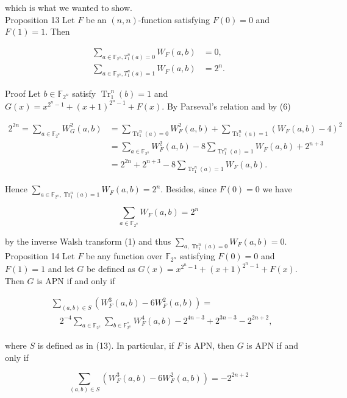 \documentclass[10pt]{article}
\begin{document}
which is what we wanted to show.\\
Proposition 13 Let $F$ be an $(n, n)$-function satisfying $F(0)=0$ and $F(1)=1$. Then


\begin{align*}
\sum_{a \in \mathbb{F}_{2^{n}}, T_{1}^{n}(a)=0} W_{F}(a, b) & =0,  \tag{20}\\
\sum_{a \in \mathbb{F}_{2^{n}}, T_{1}^{n}(a)=1} W_{F}(a, b) & =2^{n} . \tag{21}
\end{align*}


Proof Let $b \in \mathbb{F}_{2^{n}}$ satisfy $\operatorname{Tr}_{1}^{n}(b)=1$ and $G(x)=x^{2^{n}-1}+(x+1)^{2^{n}-1}+F(x)$. By Parseval's relation and by (6)

$$
\begin{aligned}
2^{2 n}=\sum_{a \in \mathbb{F}_{2^{n}}} W_{G}^{2}(a, b) & =\sum_{\operatorname{Tr}_{1}^{n}(a)=0} W_{F}^{2}(a, b)+\sum_{\operatorname{Tr}_{1}^{n}(a)=1}\left(W_{F}(a, b)-4\right)^{2} \\
& =\sum_{a \in \mathbb{F}_{2^{n}}} W_{F}^{2}(a, b)-8 \sum_{\operatorname{Tr}_{1}^{n}(a)=1} W_{F}(a, b)+2^{n+3} \\
& =2^{2 n}+2^{n+3}-8 \sum_{\operatorname{Tr}_{1}^{n}(a)=1} W_{F}(a, b) .
\end{aligned}
$$

Hence $\sum_{a \in \mathbb{F}_{2^{n}}, \operatorname{Tr}_{1}^{n}(a)=1} W_{F}(a, b)=2^{n}$. Besides, since $F(0)=0$ we have

$$
\sum_{a \in \mathbb{F}_{2^{n}}} W_{F}(a, b)=2^{n}
$$

by the inverse Walsh transform (1) and thus $\sum_{a, \operatorname{Tr}_{1}^{n}(a)=0} W_{F}(a, b)=0$.\\
Proposition 14 Let $F$ be any function over $\mathbb{F}_{2^{n}}$ satisfying $F(0)=0$ and $F(1)=1$ and let $G$ be defined as $G(x)=x^{2^{n}-1}+(x+1)^{2^{n}-1}+F(x)$. Then $G$ is APN if and only if


\begin{align*}
& \sum_{(a, b) \in S}\left(W_{F}^{3}(a, b)-6 W_{F}^{2}(a, b)\right)= \\
& \quad 2^{-4} \sum_{a \in \mathbb{F}_{2^{n}}} \sum_{b \in \mathbb{F}_{2^{n}}^{*}} W_{F}^{4}(a, b)-2^{4 n-3}+2^{3 n-3}-2^{2 n+2}, \tag{22}
\end{align*}


where $S$ is defined as in (13). In particular, if $F$ is APN, then $G$ is APN if and only if


\begin{equation*}
\sum_{(a, b) \in S}\left(W_{F}^{3}(a, b)-6 W_{F}^{2}(a, b)\right)=-2^{2 n+2} \tag{23}
\end{equation*}
\end{document}
